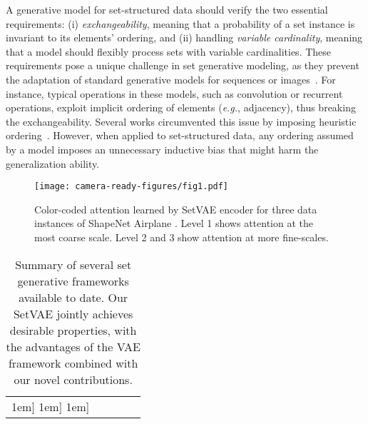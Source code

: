 \documentclass[final]{arxiv/cvpr}
\begin{document}
A generative model for set-structured data should verify the two essential requirements: (i) \textit{exchangeability}, meaning that a probability of a set instance is invariant to its elements' ordering, and (ii) handling \textit{variable cardinality}, meaning that a model should flexibly process sets with variable cardinalities.
These requirements pose a unique challenge in set generative modeling, as they prevent the adaptation of standard generative models for sequences or images~\cite{goodfellow2014generative, karras2019stylebased, oord2016pixel,oord2016conditional}. 
For instance, typical operations in these models, such as convolution or recurrent operations, exploit implicit ordering of elements (\emph{e.g.}, adjacency), thus breaking the exchangeability.
Several works circumvented this issue by imposing heuristic ordering~\cite{hong2018inferring, eslami2016attend, greff2019multi, ritchie2019fast}.
However, when applied to set-structured data, any ordering assumed by a model imposes an unnecessary inductive bias that might harm the generalization ability.

\begin{figure}[t]
    \begin{center}
        \texttt{[image: camera-ready-figures/fig1.pdf]}
    \end{center}
\caption{Color-coded attention learned by SetVAE encoder for three data instances of ShapeNet Airplane \cite{chang2015shapenet}. Level 1 shows attention at the most coarse scale. Level 2 and 3 show attention at more fine-scales.
    }
\label{fig:eyecatcher}
\end{figure}

\begin{table*}[!ht]
\centering
\footnotesize
\caption{Summary of several set generative frameworks available to date. Our SetVAE jointly achieves desirable properties, with the advantages of the VAE framework combined with our novel contributions.
}
\begin{tabular}{l>{\centering}m{}>{\centering}m{}>{\centering}m{}>{\centering\arraybackslash}m{}}
\Xhline{2\arrayrulewidth}
\-1em]\Xhline{2\arrayrulewidth}
\-1em]\hline
\-1em]\Xhline{2\arrayrulewidth}
\end{tabular}
\label{table:framework}
\end{table*}
\end{document}
